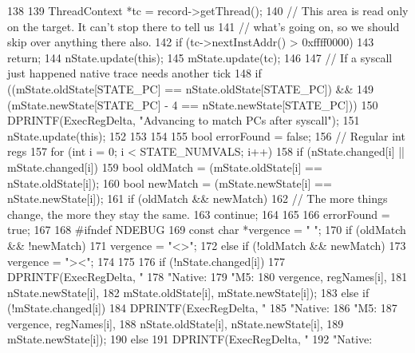 \begin{DoxyCode}
138 {
139     ThreadContext *tc = record->getThread();
140     // This area is read only on the target. It can't stop there to tell us
141     // what's going on, so we should skip over anything there also.
142     if (tc->nextInstAddr() > 0xffff0000)
143         return;
144     nState.update(this);
145     mState.update(tc);
146 
147     // If a syscall just happened native trace needs another tick
148     if ((mState.oldState[STATE_PC] == nState.oldState[STATE_PC]) &&
149             (mState.newState[STATE_PC] - 4 == nState.newState[STATE_PC])) {
150             DPRINTF(ExecRegDelta, "Advancing to match PCs after syscall\n");
151             nState.update(this);
152 
153     }
154 
155     bool errorFound = false;
156     // Regular int regs
157     for (int i = 0; i < STATE_NUMVALS; i++) {
158         if (nState.changed[i] || mState.changed[i]) {
159             bool oldMatch = (mState.oldState[i] == nState.oldState[i]);
160             bool newMatch = (mState.newState[i] == nState.newState[i]);
161             if (oldMatch && newMatch) {
162                 // The more things change, the more they stay the same.
163                 continue;
164             }
165 
166             errorFound = true;
167 
168 #ifndef NDEBUG
169             const char *vergence = "  ";
170             if (oldMatch && !newMatch) {
171                 vergence = "<>";
172             } else if (!oldMatch && newMatch) {
173                 vergence = "><";
174             }
175 
176             if (!nState.changed[i]) {
177                 DPRINTF(ExecRegDelta, "%
178                                       "Native:         %
179                                       "M5:     %
180                                       vergence, regNames[i],
181                                       nState.newState[i],
182                                       mState.oldState[i], mState.newState[i]);
183             } else if (!mState.changed[i]) {
184                 DPRINTF(ExecRegDelta, "%
185                                       "Native: %
186                                       "M5:             %
187                                       vergence, regNames[i],
188                                       nState.oldState[i], nState.newState[i],
189                                       mState.newState[i]);
190             } else {
191                 DPRINTF(ExecRegDelta, "%
192                                       "Native: %
}}}}
\end{DoxyCode}
